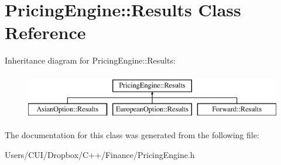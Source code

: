 \hypertarget{class_pricing_engine_1_1_results}{}\section{Pricing\+Engine\+:\+:Results Class Reference}
\label{class_pricing_engine_1_1_results}
Inheritance diagram for Pricing\+Engine\+:\+:Results\+:\begin{figure}[H]
\begin{center}
\leavevmode
\includegraphics[height=2.000000cm]{class_pricing_engine_1_1_results}
\end{center}
\end{figure}


The documentation for this class was generated from the following file\+:\begin{DoxyCompactItemize}
\item 
Users/\+C\+U\+I/\+Dropbox/\+C++/\+Finance/Pricing\+Engine.\+h\end{DoxyCompactItemize}
